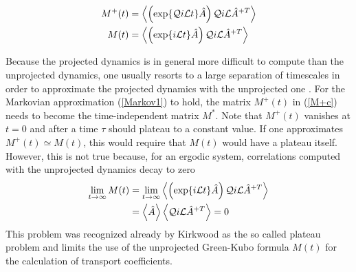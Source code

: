 \documentclass[b5paper,openright,10pt]{book}
\newcommand{\llangle}{\left\langle}
\newcommand{\rrangle}{\right\rangle}
\begin{document}
\begin{align}
M^+(t)&=
  \llangle\left(\exp\{{\cal Q}i{\cal L}t\}  \hat{A}\right){\cal Q}i{\cal L}\hat{A}^{+T} \rrangle
\nonumber\\
M(t)&=
  \llangle\left(\exp\{i{\cal L}t\}  \hat{A}\right){\cal Q}i{\cal L}\hat{A}^{+T} \rrangle
\label{m+}
\end{align}

Because the projected dynamics is in general more difficult to compute
than  the  unprojected  dynamics,  one  usually  resorts  to  a  large
separation  of  timescales  in  order  to approximate  the  projected
dynamics with  the unprojected  one \cite{Zwanzig1961,Selwyn1971,Mazur1970}.
For the  Markovian approximation  (\ref{Markov1}) to hold,  the matrix
$M^+(t)$ in  (\ref{M+c}) needs  to become the  time-independent matrix
$M^*$.  Note that  $M^+(t)$ vanishes at $t=0$ and after  a time $\tau$
should plateau to a constant value.  If one approximates $M^+(t)\simeq
M(t)$,  this   would  require  that   $M(t)$  would  have   a  plateau
itself.  However, this  is not  true because,  for an  ergodic system,
correlations computed with the unprojected dynamics decay to zero
\begin{align}
  \lim_{t\to\infty}M(t)&= \lim_{t\to\infty} \llangle\left(\exp\{i{\cal L}t\}  \hat{A}\right){\cal Q}i{\cal L}\hat{A}^{+T} \rrangle
\nonumber\\
&=
 \llangle  \hat{A}\rrangle\llangle{\cal Q}i{\cal L}\hat{A}^{+T} \rrangle=0
\end{align}
This  problem was  recognized already  by  Kirkwood as  the so  called
plateau problem \cite{Kirkwood1949,Espanol1993}  and limits the
use of the  unprojected Green-Kubo formula $M(t)$  for the calculation
of transport coefficients.
\end{document}
